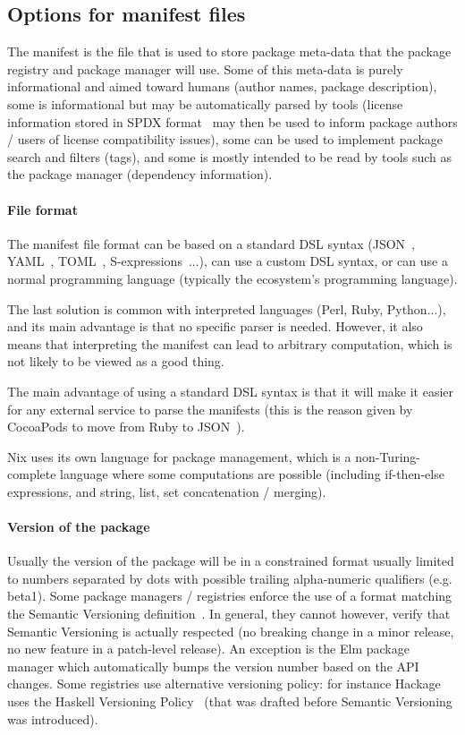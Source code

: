 \subsection{Options for manifest files}

The manifest is the file that is used to store package meta-data that the package registry and package manager will use.
Some of this meta-data is purely informational and aimed toward humans (author names, package description), some is informational but may be automatically parsed by tools (license information stored in SPDX format~\cite{spdx} may then be used to inform package authors / users of license compatibility issues), some can be used to implement package search and filters (tags), and some is mostly intended to be read by tools such as the package manager (dependency information).

\paragraph{File format}

The manifest file format can be based on a standard DSL syntax (JSON~\cite{json2017rfc}, YAML~\cite{benkiki2009yaml}, TOML~\cite{preston_toml}, S-expressions~\cite{rivest1997sexp}...), can use a custom DSL syntax, or can use a normal programming language (typically the ecosystem's programming language).

The last solution is common with interpreted languages (Perl, Ruby, Python...), and its main advantage is that no specific parser is needed.
However, it also means that interpreting the manifest can lead to arbitrary computation, which is not likely to be viewed as a good thing.

The main advantage of using a standard DSL syntax is that it will make it easier for any external service to parse the manifests (this is the reason given by CocoaPods to move from Ruby to JSON~\cite{duran2014cocoapods}).

Nix uses its own language for package management, which is a non-Turing-complete language where some computations are possible (including if-then-else expressions, and string, list, set concatenation / merging).

\paragraph{Version of the package}

Usually the version of the package will be in a constrained format usually limited to numbers separated by dots with possible trailing alpha-numeric qualifiers (e.g. beta1).
Some package managers / registries enforce the use of a format matching the Semantic Versioning definition~\cite{preston_semantic_versioning}.
In general, they cannot however, verify that Semantic Versioning is actually respected (no breaking change in a minor release, no new feature in a patch-level release).
An exception is the Elm package manager which automatically bumps the version number based on the API changes.
Some registries use alternative versioning policy: for instance Hackage uses the Haskell Versioning Policy~\cite{haskell_versioning_policy} (that was drafted before Semantic Versioning was introduced).

